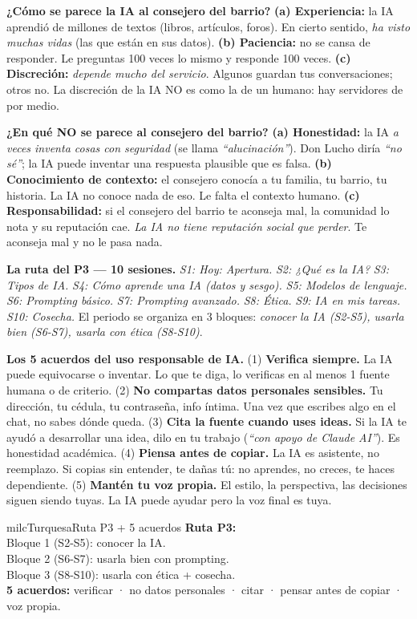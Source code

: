 \documentclass[11pt,letterpaper]{article}
\newcommand{\milcpaso}[3]{%
\Needspace{4\baselineskip}%
\begin{tcolorbox}[enhanced,colback=white,colframe=milcLinea,arc=1.5mm,boxrule=.9pt,
  left=14mm,right=4mm,top=3mm,bottom=3mm,before skip=4pt,after skip=4pt,
  fontupper=\RaggedRight,
  overlay={\node[anchor=north west,circle,fill=#2,text=white,inner sep=0pt,
    minimum size=7.4mm,font=\sffamily\bfseries\small]
    at ([xshift=3.6mm,yshift=-3.2mm]frame.north west) {#1};}]
#3
\end{tcolorbox}}
\begin{document}
\milcpaso{1}{milcTurquesa}{\textbf{¿Cómo se parece la IA al consejero del barrio?} \textbf{(a) Experiencia:} la IA aprendió de millones de textos (libros, artículos, foros). En cierto sentido, \emph{ha visto muchas vidas} (las que están en sus datos). \textbf{(b) Paciencia:} no se cansa de responder. Le preguntas 100 veces lo mismo y responde 100 veces. \textbf{(c) Discreción:} \emph{depende mucho del servicio}. Algunos guardan tus conversaciones; otros no. La discreción de la IA NO es como la de un humano: hay servidores de por medio.}
\milcpaso{2}{milcTurquesa}{\textbf{¿En qué NO se parece al consejero del barrio?} \textbf{(a) Honestidad:} la IA \emph{a veces inventa cosas con seguridad} (se llama \emph{``alucinación''}). Don Lucho diría \emph{``no sé''}; la IA puede inventar una respuesta plausible que es falsa. \textbf{(b) Conocimiento de contexto:} el consejero conocía a tu familia, tu barrio, tu historia. La IA no conoce nada de eso. Le falta el contexto humano. \textbf{(c) Responsabilidad:} si el consejero del barrio te aconseja mal, la comunidad lo nota y su reputación cae. \emph{La IA no tiene reputación social que perder}. Te aconseja mal y no le pasa nada.}
\milcpaso{3}{milcTurquesa}{\textbf{La ruta del P3 --- 10 sesiones.} \emph{S1: Hoy: Apertura.} \emph{S2: ¿Qué es la IA?} \emph{S3: Tipos de IA.} \emph{S4: Cómo aprende una IA (datos y sesgo).} \emph{S5: Modelos de lenguaje.} \emph{S6: Prompting básico.} \emph{S7: Prompting avanzado.} \emph{S8: Ética.} \emph{S9: IA en mis tareas.} \emph{S10: Cosecha.} El periodo se organiza en 3 bloques: \emph{conocer la IA (S2-S5), usarla bien (S6-S7), usarla con ética (S8-S10)}.}
\milcpaso{4}{milcTurquesa}{\textbf{Los 5 acuerdos del uso responsable de IA.} (1) \textbf{Verifica siempre.} La IA puede equivocarse o inventar. Lo que te diga, lo verificas en al menos 1 fuente humana o de criterio. (2) \textbf{No compartas datos personales sensibles.} Tu dirección, tu cédula, tu contraseña, info íntima. Una vez que escribes algo en el chat, no sabes dónde queda. (3) \textbf{Cita la fuente cuando uses ideas.} Si la IA te ayudó a desarrollar una idea, dilo en tu trabajo (\emph{``con apoyo de Claude AI''}). Es honestidad académica. (4) \textbf{Piensa antes de copiar.} La IA es asistente, no reemplazo. Si copias sin entender, te dañas tú: no aprendes, no creces, te haces dependiente. (5) \textbf{Mantén tu voz propia.} El estilo, la perspectiva, las decisiones siguen siendo tuyas. La IA puede ayudar pero la voz final es tuya.}

\begin{drawbox}{milcTurquesa}{Ruta P3 + 5 acuerdos}
\textbf{Ruta P3:} \\[1mm]
Bloque 1 (S2-S5): conocer la IA. \\[1mm]
Bloque 2 (S6-S7): usarla bien con prompting. \\[1mm]
Bloque 3 (S8-S10): usarla con ética + cosecha. \\[1mm]
\textbf{5 acuerdos:} verificar · no datos personales · citar · pensar antes de copiar · voz propia.
\end{drawbox}
\end{document}
